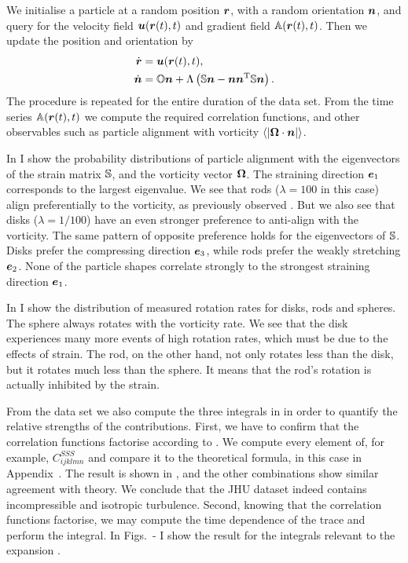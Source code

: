 \documentclass[thesis.tex]{subfiles}
\begin{document}
We initialise a particle at a random position $\mbox{\boldmath$r$}$, with a random orientation $\mbox{\boldmath$n$}$, and query for the velocity field $\mbox{\boldmath$u$}(\mbox{\boldmath$r$}(t), t)$ and gradient field $\mathbb{A}(\mbox{\boldmath$r$}(t), t)$. Then we update the position and orientation by
\begin{align*}
	\dot {\mbox{\boldmath$r$}} &= \mbox{\boldmath$u$}(\mbox{\boldmath$r$}(t), t), \\
	\dot {\mbox{\boldmath$n$}} &= \mathbb{O} \mbox{\boldmath$n$} + \Lambda\left(\mathbb{S} \mbox{\boldmath$n$} - \mbox{\boldmath$n$} \mbox{\boldmath$n$}^{\mathrm T} \mathbb{S} \mbox{\boldmath$n$}\right).
\end{align*}
The procedure is repeated for the entire duration of the data set. From the time series $\mathbb{A}(\mbox{\boldmath$r$}(t), t)$ we compute the required correlation functions, and other observables such as particle alignment with vorticity $\langle|\mbox{\boldmath$\Omega$} \cdot \mbox{\boldmath$n$}|\rangle$.


In  I show the probability distributions of particle alignment with the eigenvectors of the strain matrix $\mathbb{S}$, and the vorticity vector $\mbox{\boldmath$\Omega$}$. The straining direction $\mbox{\boldmath$e$}_1$ corresponds to the largest eigenvalue. We see that rods ($\lambda=100$ in this case) align preferentially to the vorticity, as previously observed \cite{pumir2011}. But we also see that disks ($\lambda=1/100$) have an even stronger preference to anti-align with the vorticity. The same pattern of opposite preference holds for the eigenvectors of $\mathbb{S}$. Disks prefer the compressing direction $\mbox{\boldmath$e$}_3$, while rods prefer the weakly stretching $\mbox{\boldmath$e$}_2$. None of the particle shapes correlate strongly to the strongest straining direction $\mbox{\boldmath$e$}_1$.

In  I show the distribution of measured rotation rates for disks, rods and spheres. 
The sphere always rotates with the vorticity rate. We see that the disk experiences many more events of high rotation rates, which must be due to the effects of strain. The rod, on the other hand, not only rotates less than the disk, but it rotates much less than the sphere. It means that the rod's rotation is actually inhibited by the strain.

From the data set we also compute the three integrals in  in order to quantify the relative strengths of the contributions. First, we have to confirm that the correlation functions factorise according to . We compute every element of, for example, $C^{SSS}_{ijklmn}$ and compare it to the theoretical formula, in this case  in Appendix~. The result is shown in , and the other combinations show similar agreement with theory. We conclude that the JHU dataset indeed contains incompressible and isotropic turbulence. Second, knowing that the correlation functions factorise, we may compute the time dependence of the trace and perform the integral. In Figs.~- I show the result for the integrals relevant to the expansion .
\end{document}
